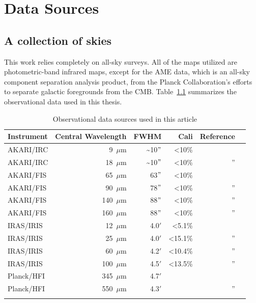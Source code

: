 \chapter{Data Sources}
  \label{ch:datasources}

  \section{A collection of skies}
    This work relies completely on all-sky surveys. All of the maps utilized are photometric-band infrared maps, except for the AME data, which is an all-sky component separation analysis product, from the Planck Collaboration's efforts to separate galactic foregrounds from the CMB. Table~\ref{tab:data} summarizes the observational data used in this thesis.
    \begin{table}[h]
      \caption{Observational data sources used in this article}
      \centering
        \begin{tabular}{lrrrrr}
        \hline\hline
        Instrument & Central Wavelength & FWHM & Cali & Reference \\
        \hline
        AKARI/IRC & 9~$\mu$m  &  \~{}10$"$ & \textless 10\%   & \tablefootnote{\cite{ishihara10}} \\
        AKARI/IRC & 18~$\mu$m & \~{}10$"$  & \textless 10\%     & '' \\
        AKARI/FIS & 65~$\mu$m  & 63$"$ & \textless 10\% & \tablefootnote{\cite{doi15,takita16}} \\
        AKARI/FIS & 90~$\mu$m  & 78$"$ & \textless 10\%   & '' \\
        AKARI/FIS & 140~$\mu$m & 88$"$ & \textless 10\%   & '' \\
        AKARI/FIS & 160~$\mu$m & 88$"$ & \textless 10\%   & '' \\
        IRAS/IRIS & 12~$\mu$m   & 4.0$'$ &   \textless 5.1\%       & \tablefootnote{\cite{iris05}} \\
        IRAS/IRIS & 25~$\mu$m   & 4.0$'$ &    \textless 15.1\%      & ''\\
        IRAS/IRIS & 60~$\mu$m   & 4.2$'$ &    \textless 10.4\%      & '' \\
        IRAS/IRIS & 100~$\mu$m  & 4.5$'$ &   \textless 13.5\%       & '' \\
        Planck/HFI & 345~$\mu$m & 4.7$'$ & & \tablefootnote{\cite{hfi14viii}} \\
        Planck/HFI & 550~$\mu$m & 4.3$'$& & '' \\
        \hline
         \label{tab:data}
      \end{tabular}
    \end{table}
